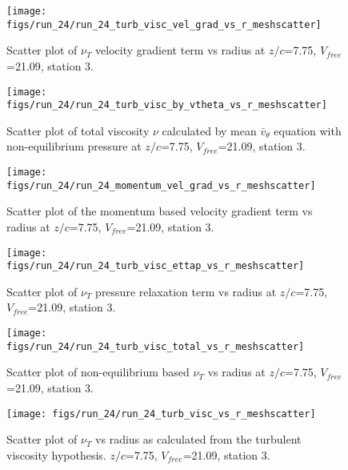 \begin{figure}[H]
\centering
\texttt{[image: figs/run\_24/run\_24\_turb\_visc\_vel\_grad\_vs\_r\_meshscatter]}
\caption{Scatter plot of $\nu_T$ velocity gradient term vs radius at $z/c$=7.75, $V_{free}$=21.09, station 3.}
\end{figure}


\begin{figure}[H]
\centering
\texttt{[image: figs/run\_24/run\_24\_turb\_visc\_by\_vtheta\_vs\_r\_meshscatter]}
\caption{Scatter plot of total viscosity $\nu$ calculated by mean $\bar{v}_{\theta}$ equation with non-equilibrium pressure at $z/c$=7.75, $V_{free}$=21.09, station 3.}
\end{figure}


\begin{figure}[H]
\centering
\texttt{[image: figs/run\_24/run\_24\_momentum\_vel\_grad\_vs\_r\_meshscatter]}
\caption{Scatter plot of the momentum based velocity gradient term vs radius at $z/c$=7.75, $V_{free}$=21.09, station 3.}
\end{figure}


\begin{figure}[H]
\centering
\texttt{[image: figs/run\_24/run\_24\_turb\_visc\_ettap\_vs\_r\_meshscatter]}
\caption{Scatter plot of $\nu_T$ pressure relaxation term vs radius at $z/c$=7.75, $V_{free}$=21.09, station 3.}
\end{figure}


\begin{figure}[H]
\centering
\texttt{[image: figs/run\_24/run\_24\_turb\_visc\_total\_vs\_r\_meshscatter]}
\caption{Scatter plot of non-equilibrium based $\nu_T$ vs radius at $z/c$=7.75, $V_{free}$=21.09, station 3.}
\end{figure}


\begin{figure}[H]
\centering
\texttt{[image: figs/run\_24/run\_24\_turb\_visc\_vs\_r\_meshscatter]}
\caption{Scatter plot of $\nu_T$ vs radius as calculated from the turbulent viscosity hypothesis. $z/c$=7.75, $V_{free}$=21.09, station 3.}
\end{figure}


